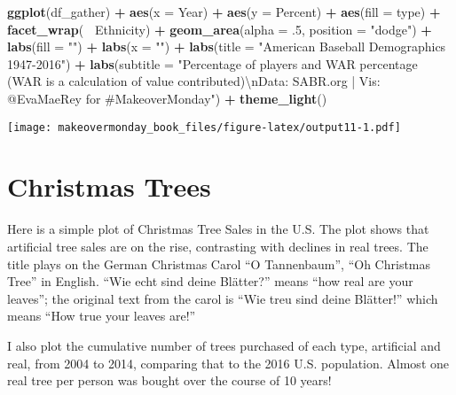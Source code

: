 \documentclass[]{book}
\newenvironment{Shaded}{\begin{snugshade}}{\end{snugshade}}
\newcommand{\KeywordTok}[1]{\textcolor[rgb]{0.13,0.29,0.53}{\textbf{#1}}}
\newcommand{\DataTypeTok}[1]{\textcolor[rgb]{0.13,0.29,0.53}{#1}}
\newcommand{\DecValTok}[1]{\textcolor[rgb]{0.00,0.00,0.81}{#1}}
\newcommand{\CharTok}[1]{\textcolor[rgb]{0.31,0.60,0.02}{#1}}
\newcommand{\StringTok}[1]{\textcolor[rgb]{0.31,0.60,0.02}{#1}}
\newcommand{\OperatorTok}[1]{\textcolor[rgb]{0.81,0.36,0.00}{\textbf{#1}}}
\newcommand{\NormalTok}[1]{#1}
\theoremstyle{definition}
\theoremstyle{definition}
\theoremstyle{definition}
\theoremstyle{remark}
\begin{document}
\begin{Shaded}
\begin{Highlighting}[]
\KeywordTok{ggplot}\NormalTok{(df_gather) }\OperatorTok{+}
\StringTok{  }\KeywordTok{aes}\NormalTok{(}\DataTypeTok{x =}\NormalTok{ Year) }\OperatorTok{+}
\StringTok{  }\KeywordTok{aes}\NormalTok{(}\DataTypeTok{y =}\NormalTok{ Percent) }\OperatorTok{+}
\StringTok{  }\KeywordTok{aes}\NormalTok{(}\DataTypeTok{fill =}\NormalTok{ type) }\OperatorTok{+}
\StringTok{  }\KeywordTok{facet_wrap}\NormalTok{(}\OperatorTok{~}\StringTok{ }\NormalTok{Ethnicity) }\OperatorTok{+}
\StringTok{  }\KeywordTok{geom_area}\NormalTok{(}\DataTypeTok{alpha =}\NormalTok{ .}\DecValTok{5}\NormalTok{, }\DataTypeTok{position =} \StringTok{"dodge"}\NormalTok{) }\OperatorTok{+}
\StringTok{  }\KeywordTok{labs}\NormalTok{(}\DataTypeTok{fill =} \StringTok{""}\NormalTok{) }\OperatorTok{+}
\StringTok{  }\KeywordTok{labs}\NormalTok{(}\DataTypeTok{x =} \StringTok{""}\NormalTok{) }\OperatorTok{+}
\StringTok{  }\KeywordTok{labs}\NormalTok{(}\DataTypeTok{title =} \StringTok{"American Baseball Demographics 1947-2016"}\NormalTok{) }\OperatorTok{+}
\StringTok{  }\KeywordTok{labs}\NormalTok{(}\DataTypeTok{subtitle =} \StringTok{"Percentage of players and WAR percentage (WAR is a calculation of value contributed)}\CharTok{\textbackslash{}n}\StringTok{Data: SABR.org | Vis: @EvaMaeRey for #MakeoverMonday"}\NormalTok{) }\OperatorTok{+}
\StringTok{  }\KeywordTok{theme_light}\NormalTok{() }
\end{Highlighting}
\end{Shaded}

\texttt{[image: makeovermonday\_book\_files/figure-latex/output11-1.pdf]}

\chapter{Christmas Trees}\label{christmas-trees}

Here is a simple plot of Christmas Tree Sales in the U.S. The plot shows
that artificial tree sales are on the rise, contrasting with declines in
real trees. The title plays on the German Christmas Carol ``O
Tannenbaum'', ``Oh Christmas Tree'' in English. ``Wie echt sind deine
Blätter?'' means ``how real are your leaves''; the original text from
the carol is ``Wie treu sind deine Blätter!'' which means ``How true
your leaves are!''

I also plot the cumulative number of trees purchased of each type,
artificial and real, from 2004 to 2014, comparing that to the 2016 U.S.
population. Almost one real tree per person was bought over the course
of 10 years!
\end{document}
